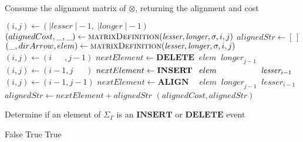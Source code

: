 \documentclass[11pt]{article}
\begin{document}
\begin{algorithm}
  \caption{Consume the alignment matrix of $\otimes$, returning the alignment and cost}\label{matrixTraceback}
  \begin{algorithmic}[1]

      \State $\left( i, j \right) \gets \left( \vert \textit{lesser} \;\vert - 1,\; \vert \textit{longer} \;\vert - 1 \right)$
      \State \Return $\left( alignedCost, \_, \_ \right) \gets \Call{matrixDefinition}{\textit{lesser}, \textit{longer}, \sigma, i, j}$
      \State $alignedStr \gets \left[ \,\right]$
        \State $\left( \_, dirArrow, elem \right) \gets \Call{matrixDefinition}{\textit{lesser}, \textit{longer}, \sigma, i, j}$
          \Case{$\leftarrow$}
            \State $\left( i, j\right) \gets \left( i \quad\;\;, j - 1       \right)$
            \State $nextElement \gets \textbf{DELETE} \;\;   elem \;\; \textit{longer}_{j-1}$
          \EndCase
          \Case{$\uparrow$}
            \State $\left( i, j\right) \gets \left( i - 1      , j \quad\;\; \right)$
            \State $nextElement \gets \textbf{INSERT} \;\;\; elem \hspace{1.9cm} \textit{lesser}_{i-1}$
          \EndCase
          \Case{$\nwarrow$}
            \State $\left( i, j\right) \gets \left( i - 1      , j - 1       \right)$
            \State $nextElement \gets \textbf{ALIGN} \quad\; elem \;\; \textit{longer}_{j-1} \;\; \textit{lesser}_{i-1}$
          \EndCase
        \EndSwitch
        \State $alignedStr \gets nextElement + alignedStr$
      \EndWhile
      \State \Return $\left(alignedCost, alignedStr \right)$
    \EndFunction  
  \end{algorithmic}
\end{algorithm}

\begin{algorithm}
  \caption{Determine if an element of $\Sigma_{\Gamma}$ is an $\textbf{INSERT}$ or $\textbf{DELETE}$ event}\label{isInsDel}
  \begin{algorithmic}[1]
          \State \Return False
        \EndCase
          \State \Return True
        \EndCase
          \State \Return True
        \EndCase
      \EndSwitch
    \EndFunction  
  \end{algorithmic}
\end{algorithm}
\end{document}
